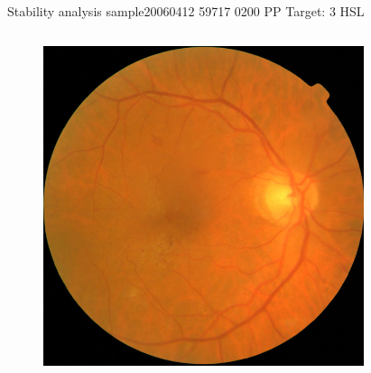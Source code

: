 \documentclass{beamer}
\begin{document}
\begin{frame}{Stability analysis sample}{20060412 59717 0200 PP Target: 3 HSL}
\begin{columns}
	\begin{column}{0.3\textwidth}
		\begin{figure}[p]
			\centering
			\includegraphics[width=\textwidth]{chapter_stability/20060412_59717_0200_PP/20060412_59717_0200_PP.jpeg}
		\end{figure}	
	\end{column}
	\begin{column}{0.45\textwidth}  %
		\begin{figure}[p]
			\centering

\end{figure}
\end{column}
\end{columns}
\end{frame}
\end{document}
